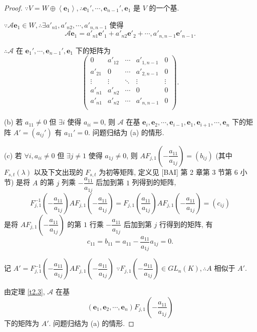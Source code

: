 \documentclass[color=black,device=normal,lang=cn,mode=geye]{elegantnote}
\begin{document}
\begin{proof}
    $\because V=W\oplus\left<\boldsymbol{e}_1\right>,\therefore\boldsymbol{e}_1',\cdots,\boldsymbol{e}_{n-1}',\boldsymbol{e}_1$ 是 $V$ 的一个基.
    
    $\because\mathcal{A}\boldsymbol{e}_1\in W,\therefore\exists a'_{n1},a'_{n2},\cdots,a'_{n,n-1}$ 使得
    \[\mathcal{A}\boldsymbol{e}_1=a'_{n1}\boldsymbol{e}'_1+a'_{n2}\boldsymbol{e}'_2+\cdots,a'_{n,n-1}\boldsymbol{e}'_{n-1}.\]

    $\therefore\mathcal{A}$ 在 $\boldsymbol{e}_1',\cdots,\boldsymbol{e}_{n-1}',\boldsymbol{e}_1$ 下的矩阵为
    \[\begin{pmatrix}
        0 & a'_{12} & \cdots & a'_{1,n-1} & 0 \\
        a'_{21} & 0 & \cdots & a'_{2,n-1} & 0 \\
        \vdots & \vdots & \ddots & \vdots & \vdots \\
        a'_{n1} & a'_{n2} & \cdots & 0 & 0 \\
        a'_{n1} & a'_{n2} & \cdots & a'_{n,n-1} & 0 \\
    \end{pmatrix}.\]

    (b) 若 $a_{11}\neq0$ 但 $\exists i$ 使得 $a_{ii}=0$, 则 $\mathcal{A}$ 在基 $\boldsymbol{e}_i,\boldsymbol{e}_2,\cdots,\boldsymbol{e}_{i-1},\boldsymbol{e}_1,\boldsymbol{e}_{i+1},\cdots,\boldsymbol{e}_n$ 下的矩阵 $A'=(a_{ij}')$ 有 $a_{11}'=0$. 问题归结为 (a) 的情形.

    (c) 若 $\forall i,a_{ii}\neq0$ 但 $\exists j\neq 1$ 使得 $a_{1j}\neq0$, 则 $AF_{j,1}\left(-\dfrac{a_{11}}{a_{1j}}\right)=(b_{ij})$ (其中 $F_{s,t}(\lambda)$ 以及下文出现的 $F_{s,t}$ 为初等矩阵, 定义见 [BAI] 第 2 章第 3 节第 6 小节) 是将 $A$ 的第 $j$ 列乘 $-\dfrac{a_{11}}{a_{1j}}$ 后加到第 $1$ 列得到的矩阵,
    \[F^{-1}_{j,1}\left(-\dfrac{a_{11}}{a_{1j}}\right)AF_{j,1}\left(-\dfrac{a_{11}}{a_{1j}}\right)=F_{j,1}\left(\dfrac{a_{11}}{a_{1j}}\right)AF_{j,1}\left(-\dfrac{a_{11}}{a_{1j}}\right)=(c_{ij})\]
    是将 $AF_{j,1}\left(-\dfrac{a_{11}}{a_{1j}}\right)$ 的第 $1$ 行乘 $-\dfrac{a_{11}}{a_{1j}}$ 后加到第 $j$ 行得到的矩阵, 有
    \[c_{11}=b_{11}=a_{11}-\dfrac{a_{11}}{a_{1j}}a_{1j}=0.\]

    记 $A'=F^{-1}_{j,1}\left(-\dfrac{a_{11}}{a_{1j}}\right)AF_{j,1}\left(-\dfrac{a_{11}}{a_{1j}}\right)$ $\because F_{j,1}\left(-\dfrac{a_{11}}{a_{1j}}\right)\in GL _n(K),\therefore A$ 相似于 $A'$.

    由定理 \ref{t2.3}, $\mathcal{A}$ 在基
    \[(\boldsymbol{e}_1,\boldsymbol{e}_2,\cdots,\boldsymbol{e}_n)F_{j,1}\left(-\dfrac{a_{11}}{a_{1j}}\right)\]
    下的矩阵为 $A'$. 问题归结为 (a) 的情形.


\end{proof}
\end{document}
